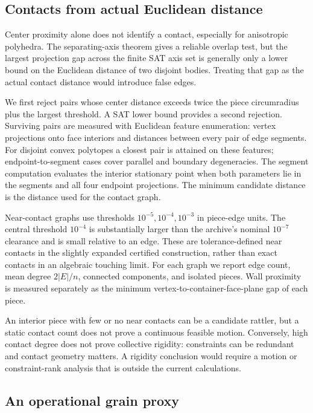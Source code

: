 \documentclass[11pt,a4paper]{article}
\begin{document}
\subsection{Contacts from actual Euclidean distance}

Center proximity alone does not identify a contact, especially for anisotropic polyhedra. The separating-axis theorem gives a reliable overlap test, but the largest projection gap across the finite SAT axis set is generally only a lower bound on the Euclidean distance of two disjoint bodies. Treating that gap as the actual contact distance would introduce false edges.

We first reject pairs whose center distance exceeds twice the piece circumradius plus the largest threshold. A SAT lower bound provides a second rejection. Surviving pairs are measured with Euclidean feature enumeration: vertex projections onto face interiors and distances between every pair of edge segments. For disjoint convex polytopes a closest pair is attained on these features; endpoint-to-segment cases cover parallel and boundary degeneracies. The segment computation evaluates the interior stationary point when both parameters lie in the segments and all four endpoint projections. The minimum candidate distance is the distance used for the contact graph.

Near-contact graphs use thresholds $10^{-5},10^{-4},10^{-3}$ in piece-edge units. The central threshold $10^{-4}$ is substantially larger than the archive's nominal $10^{-7}$ clearance and is small relative to an edge. These are tolerance-defined near contacts in the slightly expanded certified construction, rather than exact contacts in an algebraic touching limit. For each graph we report edge count, mean degree $2|E|/n$, connected components, and isolated pieces. Wall proximity is measured separately as the minimum vertex-to-container-face-plane gap of each piece.

An interior piece with few or no near contacts can be a candidate rattler, but a static contact count does not prove a continuous feasible motion. Conversely, high contact degree does not prove collective rigidity: constraints can be redundant and contact geometry matters. A rigidity conclusion would require a motion or constraint-rank analysis that is outside the current calculations.

\subsection{An operational grain proxy}
\end{document}
